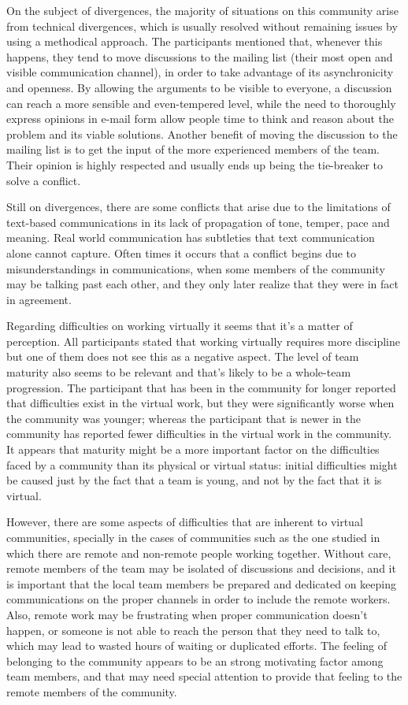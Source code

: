 \documentclass{sigchi}
\begin{document}
On the subject of divergences, the majority of situations on this community arise from technical divergences, which is usually resolved without remaining issues by using a methodical approach. The participants mentioned that, whenever this happens, they tend to move discussions to the mailing list (their most open and visible communication channel), in order to take advantage of its asynchronicity and openness. By allowing the arguments to be visible to everyone, a discussion can reach a more sensible and even-tempered level, while the need to thoroughly express opinions in e-mail form allow people time to think and reason about the problem and its viable solutions. Another benefit of moving the discussion to the mailing list is to get the input of the more experienced members of the team. Their opinion is highly respected and usually ends up being the tie-breaker to solve a conflict.

Still on divergences, there are some conflicts that arise due to the limitations of text-based communications in its lack of propagation of tone, temper, pace and meaning. Real world communication has subtleties that text communication alone cannot capture. Often times it occurs that a conflict begins due to misunderstandings in communications, when some members of the community may be talking past each other, and they only later realize that they were in fact in agreement.

Regarding difficulties on working virtually it seems that it's a matter of perception. All participants stated that working virtually requires more discipline but one of them does not see this as a negative aspect. The level of team maturity also seems to be relevant and that's likely to be a whole-team progression. The participant that has been in the community for longer reported that difficulties exist in the virtual work, but they were significantly worse when the community was younger; whereas the participant that is newer in the community has reported fewer difficulties in the virtual work in the community. It appears that maturity might be a more important factor on the difficulties faced by a community than its physical or virtual status: initial difficulties might be caused just by the fact that a team is young, and not by the fact that it is virtual.

However, there are some aspects of difficulties that are inherent to virtual communities, specially in the cases of communities such as the one studied in which there are remote and non-remote people working together. Without care, remote members of the team may be isolated of discussions and decisions, and it is important that the local team members be prepared and dedicated on keeping communications on the proper channels in order to include the remote workers. Also, remote work may be frustrating when proper communication doesn't happen, or someone is not able to reach the person that they need to talk to, which may lead to wasted hours of waiting or duplicated efforts. The feeling of belonging to the community appears to be an strong motivating factor among team members, and that may need special attention to provide that feeling to the remote members of the community.
\end{document}
